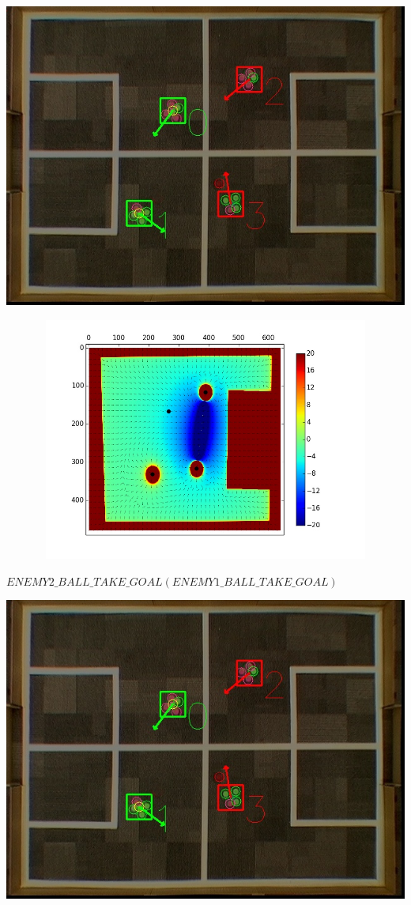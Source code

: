 \documentclass[a4paper,12pt]{article}
\begin{document}
\begin{minipage}{0.4\textwidth}
\includegraphics[scale=0.3]{v1_2.jpg}
\end{minipage}
\begin{minipage}{0.4\textwidth}
\includegraphics[height=80mm,width=135mm]{p1.jpg}
\end{minipage}\newline\newline
$ENEMY2\_BALL\_TAKE\_GOAL (ENEMY1\_BALL\_TAKE\_GOAL)$ \newline \newline
\begin{minipage}{0.4\textwidth}
\includegraphics[scale=0.3]{v1_2.jpg}
\end{minipage}
\end{document}
